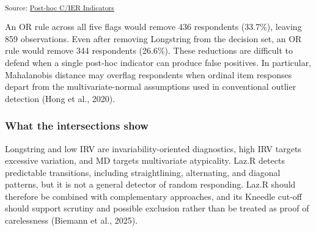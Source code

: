 \documentclass[
  letterpaper,
  DIV=11,
  numbers=noendperiod]{scrartcl}
\begin{document}
\textsubscript{Source:
\href{https://phdpablo.github.io/cier/Scripts/ProcessingScripts/02_posthoc-preview.html\#cell-tbl-decision-scenarios}{Post-hoc
C/IER Indicators}}

An OR rule across all five flags would remove 436 respondents (33.7\%),
leaving 859 observations. Even after removing Longstring from the
decision set, an OR rule would remove 344 respondents (26.6\%). These
reductions are difficult to defend when a single post-hoc indicator can
produce false positives. In particular, Mahalanobis distance may
overflag respondents when ordinal item responses depart from the
multivariate-normal assumptions used in conventional outlier detection
(Hong et al., 2020).

\subsubsection{What the intersections
show}\label{what-the-intersections-show}

Longstring and low IRV are invariability-oriented diagnostics, high IRV
targets excessive variation, and MD targets multivariate atypicality.
Laz.R detects predictable transitions, including straightlining,
alternating, and diagonal patterns, but it is not a general detector of
random responding. Laz.R should therefore be combined with complementary
approaches, and its Kneedle cut-off should support scrutiny and possible
exclusion rather than be treated as proof of carelessness (Biemann et
al., 2025).
\end{document}

